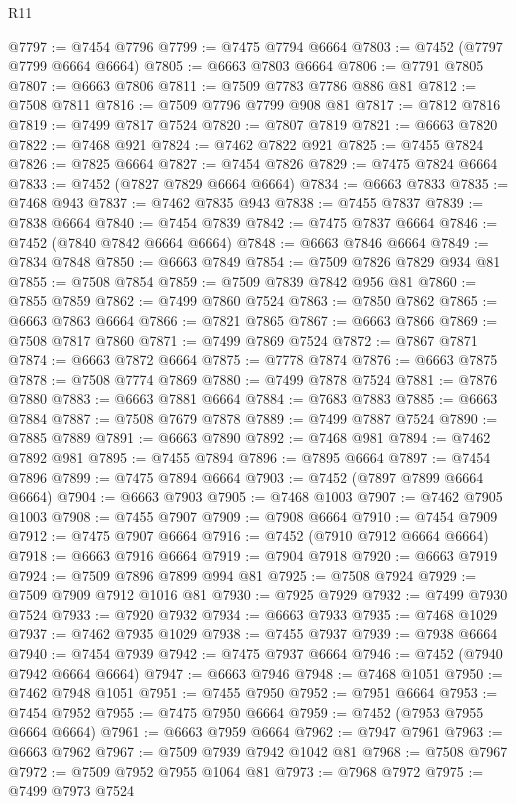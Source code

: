 \begin{lexlean}{R11}
\begin{coremodule}
{{{{{{{{{{{{{{{{{{{{{{{{{{{{{{{{{{{{{{{{{{{{{{{{{{{{{{{{{{{{{{{{{{{{{{{{{{{{{{{{{{@7797 := @7454 @7796
@7799 := @7475 @7794 @6664
@7803 := @7452 (@7797 @7799 @6664 @6664)
@7805 := @6663 @7803 @6664
@7806 := @7791 @7805
@7807 := @6663 @7806
@7811 := @7509 @7783 @7786 @886 @81
@7812 := @7508 @7811
@7816 := @7509 @7796 @7799 @908 @81
@7817 := @7812 @7816
@7819 := @7499 @7817 @7524
@7820 := @7807 @7819
@7821 := @6663 @7820
@7822 := @7468 @921
@7824 := @7462 @7822 @921
@7825 := @7455 @7824
@7826 := @7825 @6664
@7827 := @7454 @7826
@7829 := @7475 @7824 @6664
@7833 := @7452 (@7827 @7829 @6664 @6664)
@7834 := @6663 @7833
@7835 := @7468 @943
@7837 := @7462 @7835 @943
@7838 := @7455 @7837
@7839 := @7838 @6664
@7840 := @7454 @7839
@7842 := @7475 @7837 @6664
@7846 := @7452 (@7840 @7842 @6664 @6664)
@7848 := @6663 @7846 @6664
@7849 := @7834 @7848
@7850 := @6663 @7849
@7854 := @7509 @7826 @7829 @934 @81
@7855 := @7508 @7854
@7859 := @7509 @7839 @7842 @956 @81
@7860 := @7855 @7859
@7862 := @7499 @7860 @7524
@7863 := @7850 @7862
@7865 := @6663 @7863 @6664
@7866 := @7821 @7865
@7867 := @6663 @7866
@7869 := @7508 @7817 @7860
@7871 := @7499 @7869 @7524
@7872 := @7867 @7871
@7874 := @6663 @7872 @6664
@7875 := @7778 @7874
@7876 := @6663 @7875
@7878 := @7508 @7774 @7869
@7880 := @7499 @7878 @7524
@7881 := @7876 @7880
@7883 := @6663 @7881 @6664
@7884 := @7683 @7883
@7885 := @6663 @7884
@7887 := @7508 @7679 @7878
@7889 := @7499 @7887 @7524
@7890 := @7885 @7889
@7891 := @6663 @7890
@7892 := @7468 @981
@7894 := @7462 @7892 @981
@7895 := @7455 @7894
@7896 := @7895 @6664
@7897 := @7454 @7896
@7899 := @7475 @7894 @6664
@7903 := @7452 (@7897 @7899 @6664 @6664)
@7904 := @6663 @7903
@7905 := @7468 @1003
@7907 := @7462 @7905 @1003
@7908 := @7455 @7907
@7909 := @7908 @6664
@7910 := @7454 @7909
@7912 := @7475 @7907 @6664
@7916 := @7452 (@7910 @7912 @6664 @6664)
@7918 := @6663 @7916 @6664
@7919 := @7904 @7918
@7920 := @6663 @7919
@7924 := @7509 @7896 @7899 @994 @81
@7925 := @7508 @7924
@7929 := @7509 @7909 @7912 @1016 @81
@7930 := @7925 @7929
@7932 := @7499 @7930 @7524
@7933 := @7920 @7932
@7934 := @6663 @7933
@7935 := @7468 @1029
@7937 := @7462 @7935 @1029
@7938 := @7455 @7937
@7939 := @7938 @6664
@7940 := @7454 @7939
@7942 := @7475 @7937 @6664
@7946 := @7452 (@7940 @7942 @6664 @6664)
@7947 := @6663 @7946
@7948 := @7468 @1051
@7950 := @7462 @7948 @1051
@7951 := @7455 @7950
@7952 := @7951 @6664
@7953 := @7454 @7952
@7955 := @7475 @7950 @6664
@7959 := @7452 (@7953 @7955 @6664 @6664)
@7961 := @6663 @7959 @6664
@7962 := @7947 @7961
@7963 := @6663 @7962
@7967 := @7509 @7939 @7942 @1042 @81
@7968 := @7508 @7967
@7972 := @7509 @7952 @7955 @1064 @81
@7973 := @7968 @7972
@7975 := @7499 @7973 @7524
}}}}}}}}}}}}}}}}}}}}}}}}}}}}}}}}}}}}}}}}}}}}}}}}}}}}}}}}}}}}}}}}}}}}}}}}}}}}}}}}}}
\end{coremodule}
\end{lexlean}
